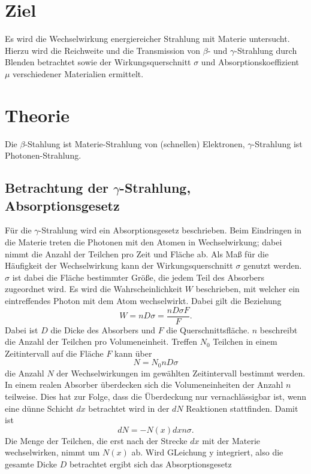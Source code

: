 \section{Ziel}
\label{sec:Ziel}
Es wird die Wechselwirkung energiereicher Strahlung mit Materie untersucht.
Hierzu wird die Reichweite und die Transmission von $\beta$- und $\gamma$-Strahlung durch Blenden betrachtet sowie der Wirkungsquerschnitt $\sigma$ und Absorptionskoeffizient $\mu$ verschiedener Materialien ermittelt.

\section{Theorie}
\label{sec:Theorie}
Die $\beta$-Stahlung ist Materie-Strahlung von (schnellen) Elektronen, $\gamma$-Strahlung ist Photonen-Strahlung.
\subsection{Betrachtung der $\gamma$-Strahlung, Absorptionsgesetz}
\label{sec:gamma}
Für die $\gamma$-Strahlung wird ein Absorptionsgesetz beschrieben.
Beim Eindringen in die Materie treten die Photonen mit den Atomen in Wechselwirkung; 
dabei nimmt die Anzahl der Teilchen pro Zeit und Fläche ab. 
Als Maß für die Häufigkeit der Wechselwirkung kann der Wirkungsquerschnitt $\sigma$ genutzt werden.
$\sigma$ ist dabei die Fläche bestimmter Größe, die jedem Teil des Absorbers zugeordnet wird. 
Es wird die Wahrscheinlichkeit $W$ beschrieben, mit welcher ein eintreffendes Photon mit dem Atom wechselwirkt. 
Dabei gilt die Beziehung 
\begin{equation}
W=n D \sigma =\frac{n D \sigma F}{F}.
\end{equation}
Dabei ist $D$ die Dicke des Absorbers und $F$ die Querschnittsfläche. 
$n$ beschreibt die Anzahl der Teilchen pro Volumeneinheit.
Treffen $N_0$ Teilchen in einem Zeitintervall auf die Fläche $F$ kann über
\begin{equation}
N=N_0 n D \sigma
\end{equation}
die Anzahl $N$ der Wechselwirkungen im gewählten Zeitintervall bestimmt werden. 
In einem realen Absorber überdecken sich die Volumeneinheiten der Anzahl $n$ teilweise. Dies hat zur Folge, dass die Überdeckung nur vernachlässigbar ist, wenn eine dünne Schicht $dx$ betrachtet wird in der $dN$ Reaktionen stattfinden. Damit ist
\begin{equation}
dN=-N(x) dx n \sigma.
\end{equation}
Die Menge der Teilchen, die erst nach der Strecke $dx$ mit der Materie wechselwirken, nimmt um $N(x)$ ab. Wird GLeichung y integriert, also die gesamte Dicke $D$ betrachtet ergibt sich das Absorptionsgesetz

